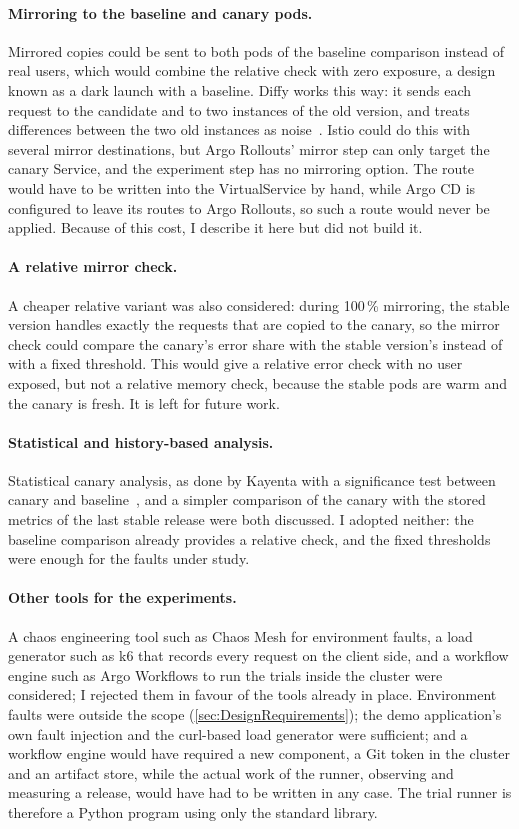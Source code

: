 \paragraph{Mirroring to the baseline and canary pods.} Mirrored copies could be sent to both pods of the baseline comparison instead of real users, which would combine the relative check with zero exposure, a design known as a dark launch with a baseline. Diffy works this way: it sends each request to the candidate and to two instances of the old version, and treats differences between the two old instances as noise~\cite{Diffy}. Istio could do this with several mirror destinations, but Argo Rollouts' mirror step can only target the canary Service, and the experiment step has no mirroring option. The route would have to be written into the VirtualService by hand, while Argo CD is configured to leave its routes to Argo Rollouts, so such a route would never be applied. Because of this cost, I describe it here but did not build it.

\paragraph{A relative mirror check.} A cheaper relative variant was also considered: during 100\,\% mirroring, the stable version handles exactly the requests that are copied to the canary, so the mirror check could compare the canary's error share with the stable version's instead of with a fixed threshold. This would give a relative error check with no user exposed, but not a relative memory check, because the stable pods are warm and the canary is fresh. It is left for future work.

\paragraph{Statistical and history-based analysis.} Statistical canary analysis, as done by Kayenta with a significance test between canary and baseline~\cite{Kayenta}, and a simpler comparison of the canary with the stored metrics of the last stable release were both discussed. I adopted neither: the baseline comparison already provides a relative check, and the fixed thresholds were enough for the faults under study.

\paragraph{Other tools for the experiments.} A chaos engineering tool such as Chaos Mesh for environment faults, a load generator such as k6 that records every request on the client side, and a workflow engine such as Argo Workflows to run the trials inside the cluster were considered; I rejected them in favour of the tools already in place. Environment faults were outside the scope (\autoref{sec:DesignRequirements}); the demo application's own fault injection and the curl-based load generator were sufficient; and a workflow engine would have required a new component, a Git token in the cluster and an artifact store, while the actual work of the runner, observing and measuring a release, would have had to be written in any case. The trial runner is therefore a Python program using only the standard library.
